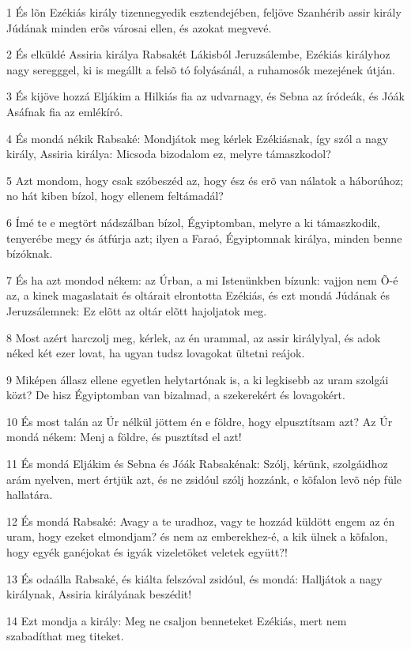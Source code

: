 \par 1 És lõn Ezékiás király tizennegyedik esztendejében, feljöve Szanhérib assir király Júdának minden erõs városai ellen, és azokat megvevé.
\par 2 És elküldé Assiria királya Rabsakét Lákisból Jeruzsálembe, Ezékiás királyhoz nagy seregggel, ki is megállt a felsõ tó folyásánál, a ruhamosók mezejének útján.
\par 3 És kijöve hozzá Eljákim a Hilkiás fia az udvarnagy, és Sebna az íródeák, és Jóák Asáfnak fia az emlékíró.
\par 4 És mondá nékik Rabsaké: Mondjátok meg kérlek Ezékiásnak, így szól a nagy király, Assiria királya: Micsoda bizodalom ez, melyre támaszkodol?
\par 5 Azt mondom, hogy csak szóbeszéd az, hogy ész és erõ van nálatok a háborúhoz; no hát kiben bízol, hogy ellenem feltámadál?
\par 6 Ímé te e megtört nádszálban bízol, Égyiptomban, melyre a ki támaszkodik, tenyerébe megy és átfúrja azt; ilyen a Faraó, Égyiptomnak királya, minden benne bízóknak.
\par 7 És ha azt mondod nékem: az Úrban, a mi Istenünkben bízunk: vajjon nem Õ-é az, a kinek magaslatait és oltárait elrontotta Ezékiás, és ezt mondá Júdának és Jeruzsálemnek: Ez elõtt az oltár elõtt hajoljatok meg.
\par 8 Most azért harczolj meg, kérlek, az én urammal, az assir királylyal, és adok néked két ezer lovat, ha ugyan tudsz lovagokat ültetni reájok.
\par 9 Miképen állasz ellene egyetlen helytartónak is, a ki legkisebb az uram szolgái közt? De hisz Égyiptomban van bizalmad, a szekerekért és lovagokért.
\par 10 És most talán az Úr nélkül jöttem én e földre, hogy elpusztítsam azt? Az Úr mondá nékem: Menj a földre, és pusztítsd el azt!
\par 11 És mondá Eljákim és Sebna és Jóák Rabsakénak: Szólj, kérünk, szolgáidhoz arám nyelven, mert értjük azt, és ne zsidóul szólj hozzánk, e kõfalon levõ nép füle hallatára.
\par 12 És mondá Rabsaké: Avagy a te uradhoz, vagy te hozzád küldött engem az én uram, hogy ezeket elmondjam? és nem az emberekhez-é, a kik ülnek a kõfalon, hogy egyék ganéjokat és igyák vizeletöket veletek együtt?!
\par 13 És odaálla Rabsaké, és kiálta felszóval zsidóul, és mondá: Halljátok a nagy királynak, Assiria királyának beszédit!
\par 14 Ezt mondja a király: Meg ne csaljon benneteket Ezékiás, mert nem szabadíthat meg titeket.
